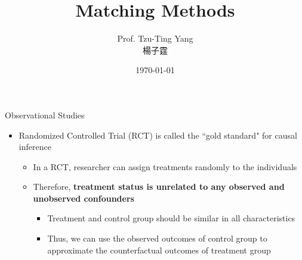 \documentclass[hyperref={pdfpagelabels=false}]{beamer}
\title[]  
{Matching Methods}
\author 
{Prof. Tzu-Ting Yang  \\ 楊子霆}
\institute{Institute of Economics, Academia Sinica  \\ 中央研究院經濟研究所}
\date
{\today}
\begin{document}
\begin{frame}{}
 \titlepage
\end{frame}






\begin{frame}{Observational Studies}
	\begin{itemize} 
		\item Randomized Controlled Trial (RCT) is called the ``gold standard" for causal inference 
		\vspace{0.3cm}
			\begin{itemize} 
		\item In a RCT, researcher can assign treatments randomly to the individuals
		\vspace{0.3cm}
		\item Therefore, \textbf{treatment status is unrelated to any observed and unobserved confounders}
					\begin{itemize} 
			\vspace{0.3cm}
		\item Treatment and control group should be similar in all characteristics
					\vspace{0.3cm}
		\item Thus, we can use the observed outcomes of control group to approximate the counterfactual outcomes of treatment group		
					\end{itemize}
			\end{itemize}
		
	\end{itemize}
\end{frame}
\end{document}
